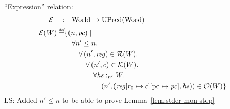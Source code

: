 \documentclass{article}
\newcommand{\update}[2]{[#1 \mapsto #2]}
\newcommand{\defeq}{\stackrel{\textit{\tiny{def}}}{=}}
\newcommand\lau[1]{{\color{purple} \sf \footnotesize {LS: #1}}\\}
\newcommand{\var}[1]{\mathit{#1}}
\newcommand{\hs}{\var{hs}}
\newcommand{\pc}{\mathit{pc}}
\newcommand{\pcreg}{\mathrm{pc}}
\newcommand{\reg}{\var{reg}}
\newcommand{\heap}{\var{heap}}
\newcommand{\heapSat}[3][\heap]{#1 :_{#2} #3}
\newcommand{\asmType}{\plaindom{AsmType}}
\newcommand{\plaindom}[1]{\mathrm{#1}}
\newcommand{\Words}{\plaindom{Word}}
\newcommand{\Worlds}{\plaindom{World}}
\newcommand{\UPred}[1]{\plaindom{UPred}(#1)}
\newcommand{\intr}[2]{\mathcal{#1}}
\newcommand{\exprintr}[1]{\intr{E}{#1}}
\newcommand{\contintr}[1]{\intr{K}{#1}}
\newcommand{\regintr}[1]{\intr{R}{#1}}
\newcommand{\stder}{\exprintr{\asmType}}
\newcommand{\stdrr}{\regintr{\asmType}}
\newcommand{\stdkr}{\contintr{\asmType}}
\newcommand{\observations}{\mathcal{O}}
\newcommand{\npair}[2][n]{\left(#1,#2 \right)}
\begin{document}
``Expression'' relation:
\begin{align*}
  \stder \quad : & \quad \Worlds \rightarrow \UPred{\Words} \\%
  \stder(W) \defeq & \{ \npair{\pc} \mid \\
                   & \quad \forall n' \leq n \ldotp\\
                   & \qquad \forall \npair[n']{\reg} \in \stdrr(W) \ldotp \\
                   & \qquad \quad \forall \npair[n']{c} \in \stdkr(W) \ldotp \\
                   & \qquad \qquad  \forall \heapSat[\hs]{n'}{W} \ldotp \\
                   & \qquad \qquad \quad \npair[n']{(\reg\update{r_0}{c}\update{\pcreg}{\pc},\hs)} \in \observations(W) \}
\end{align*}
\lau{Added $n' \leq n$ to be able to prove Lemma~\ref{lem:stder-mon-step}}
\end{document}

